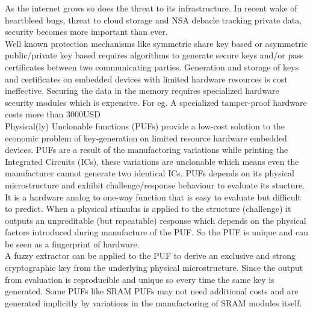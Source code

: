 As the internet grows so does the threat to its infrastructure.
In recent wake of heartbleed bugs, threat to cloud storage and NSA debacle tracking private data, security becomes more important than ever.\\

Well known protection mechanisms like symmetric share key based or asymmetric public/private key based requires algorithms to generate secure keys and/or pass certificates between two communicating parties. Generation and storage of keys and certificates on embedded devices with limited hardware resources is cost ineffective. Securing the data in the memory requires specialized hardware security modules which is expensive. For eg. A specialized tamper-proof hardware costs more than 3000USD
\cite{os8}\\

Physical(ly) Unclonable functions (PUFs) \cite{os9} provide a low-cost solution to the economic problem of key-generation on limited resource hardware embedded devices. PUFs are a result of the manufactoring variations while printing the Integrated Circuits (ICs), these variations are unclonable which means even the manufacturer cannot generate two identical ICs. PUFs depends on its physical microstructure and exhibit challenge/response behaviour to evaluate its stucture. It is a hardware analog to
one-way function that is easy to evaluate but difficult to predict. When a physical stimulus is applied to the structure (challenge) it outputs an unpreditable (but repeatable) response which depends on the physical factors introduced during manufacture of the PUF. So the PUF is unique and can be seen as a fingerprint of hardware.\cite{15}\\

A fuzzy extractor \cite{fuzzy} can be applied to the PUF to derive an exclusive and strong cryptographic key from the underlying physical microstructure. Since the output from evaluation is reproducible and unique so every time the same key is generated. Some PUFs like SRAM PUFs may not need additional costs and are generated implicitly by variations in the manufactoring of SRAM modules itself.\\

